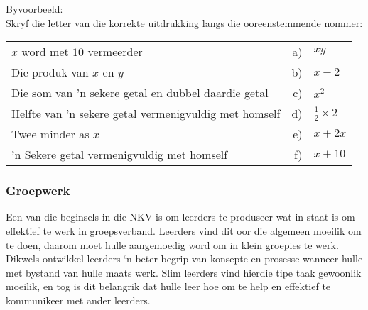 Byvoorbeeld: \\
Skryf die letter van die korrekte uitdrukking langs die ooreenstemmende nommer:
\begin{table}[H]
 \begin{center}
  \begin{tabular}{lrl} 
$x$ word met $10$ vermeerder&					a)	&$xy$ \\
Die produk van $x$ en $y$		 &		 b)	&$x-2$\\
Die som van 'n sekere getal en	dubbel daardie getal&		c)&	$x^2$\\
Helfte van 'n sekere getal vermenigvuldig met homself	&	d)&	$\frac{1}{2} \times 2$\\
Twee minder as $x$&					e)&	$x + 2x  $\\
'n Sekere getal vermenigvuldig met homself	&		f)&	$x+10$\\
  \end{tabular}
 \end{center}
\end{table}

\subsubsection{Groepwerk}
Een van die beginsels in die NKV is om leerders te produseer wat in staat is om effektief te werk in groepsverband. Leerders vind dit oor die algemeen moeilik om te doen, daarom moet hulle aangemoedig word om in klein groepies te werk. Dikwels ontwikkel leerders ‘n beter begrip van konsepte en prosesse wanneer hulle met bystand van hulle maats werk. Slim leerders vind hierdie tipe taak gewoonlik moeilik, en tog is dit belangrik dat hulle leer hoe om te help en effektief te kommunikeer met ander leerders.\par

